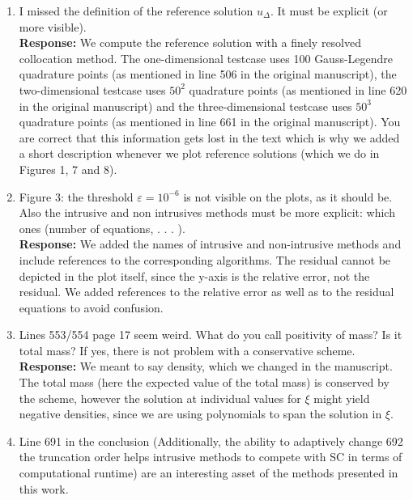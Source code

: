 \documentclass[11pt]{amsart}
\begin{document}
\begin{enumerate}
\item I missed the definition of the reference solution $u_{\Delta}$. It must be explicit
(or more visible).
\\ \textbf{Response:} We compute the reference solution with a finely resolved collocation method. The one-dimensional testcase uses 100 Gauss-Legendre quadrature points (as mentioned in line 506 in the original manuscript), the two-dimensional testcase uses $50^2$ quadrature points (as mentioned in line 620 in the original manuscript) and the three-dimensional testcase uses $50^3$ quadrature points (as mentioned in line 661 in the original manuscript). You are correct that this information gets lost in the text which is why we added a short description whenever we plot reference solutions (which we do in Figures 1, 7 and 8).
\item Figure 3: the threshold $\varepsilon = 10^{-6}$ is not visible on the plots, as it should be. Also the intrusive and non intrusives methods must be more explicit: which ones (number of equations, . . . ).
\\ \textbf{Response:} We added the names of intrusive and non-intrusive methods and include references to the corresponding algorithms. The residual cannot be depicted in the plot itself, since the y-axis is the relative error, not the residual. We added references to the relative error as well as to the residual equations to avoid confusion.
\item Lines 553/554 page 17 seem weird. What do you call positivity of mass?
Is it total mass? If yes, there is not problem with a conservative scheme.
\\ \textbf{Response:} We meant to say density, which we changed in the manuscript. The total mass (here the expected value of the total mass) is conserved by the scheme, however the solution at individual values for $\xi$ might yield negative densities, since we are using polynomials to span the solution in $\xi$. 
\item Line 691 in the conclusion (Additionally, the ability to adaptively change
692 the truncation order helps intrusive methods to compete with SC in
terms of computational runtime) are an interesting asset of the methods
presented in this work.
\end{enumerate}
\end{document}
